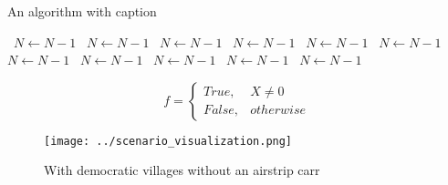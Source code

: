\documentclass[a4paper]{article}
\begin{document}
\begin{algorithm}
\caption{An algorithm with caption}
\begin{algorithmic}
\    \State $N \gets N - 1$
\    \State $N \gets N - 1$
\    \State $N \gets N - 1$
\    \State $N \gets N - 1$
\    \State $N \gets N - 1$
\    \State $N \gets N - 1$
\    \State $N \gets N - 1$
\    \State $N \gets N - 1$
\    \State $N \gets N - 1$
\    \State $N \gets N - 1$
\    \State $N \gets N - 1$
\EndWhile
\end{algorithmic}
\end{algorithm}

\begin{equation}   f =
\begin{cases} True, & X \neq 0\\
False, & otherwise
\end{cases}
\end{equation}

\begin{figure}
\centering
\texttt{[image: ../scenario\_visualization.png]}
\caption{With democratic villages without an airstrip carr
}
\end{figure}
 
\end{document}
